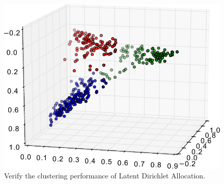 \documentclass[letterpaper]{article}
\begin{document}
\begin{figure}
\centering
\includegraphics[width=0.8\linewidth]{./fig/cluster3}
\caption{Verify the clustering performance of Latent Dirichlet Allocation.}
\label{fig:cluster3}
\end{figure}
\end{document}
